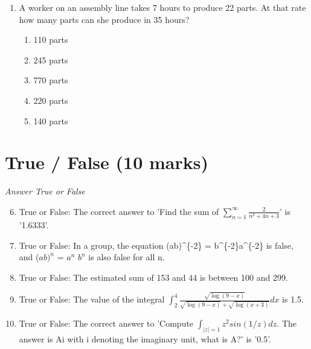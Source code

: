 \documentclass[12pt]{article}
\begin{document}
\begin{enumerate}[label=\arabic*.]
\begin{enumerate}[label=(\alph*)]
    \item 35
    \item 17
    \item 13
    \item 9
\end{enumerate}
\item A worker on an assembly line takes 7 hours to produce 22 parts. At that rate how many parts can she produce in 35 hours?
\begin{enumerate}[label=(\alph*)]
    \item 110 parts
    \item 245 parts
    \item 770 parts
    \item 220 parts
    \item 140 parts
\end{enumerate}
\end{enumerate}

\section*{True / False (10 marks)}
\textit{Answer True or False}
\begin{enumerate}[label=\arabic*.]
\setcounter{enumi}{5}
\item True or False: The correct answer to 'Find the sum of $\sum_{n=1}^{\infty} \frac{2}{n^2 + 4 n + 3}$' is '1.6333'.
\item True or False: In a group, the equation (ab)^\{-2\} = b^\{-2\}a^\{-2\} is false, and ($ab)^n$ = $a^n$ $b^n$ is also false for all n.
\item True or False: The estimated sum of 153 and 44 is between 100 and 299.
\item True or False: The value of the integral \( \int_2^4 \frac{\sqrt{\log(9-x)}}{\sqrt{\log(9-x)}+\sqrt{\log(x+3)}} dx \) is 1.5.
\item True or False: The correct answer to 'Compute $\int_{|z| = 1} z^2 sin(1/z) dz$. The answer is Ai with i denoting the imaginary unit, what is A?' is '0.5'.
\end{enumerate}
\end{document}

